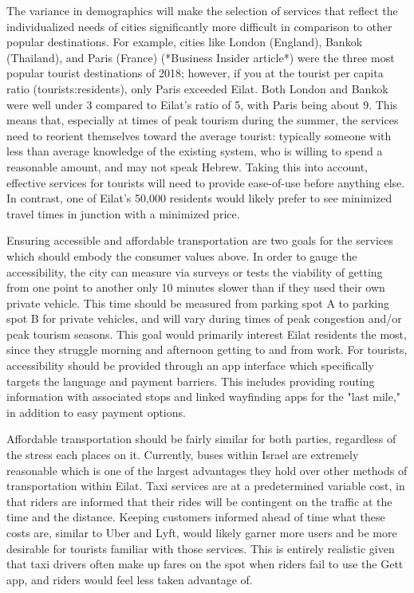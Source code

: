 \documentclass[12pt]{article}                       %
\begin{document}
The variance in demographics will make the selection of services that reflect the individualized needs of cities significantly more difficult in comparison to other popular destinations. For example, cities like London (England), Bankok (Thailand), and Paris (France) (*Business Insider article*) were the three most popular tourist destinations of 2018; however, if you at the tourist per capita ratio (tourists:residents), only Paris exceeded Eilat. Both London and Bankok were well under 3 compared to Eilat's ratio of 5, with Paris being about 9. This means that, especially at times of peak tourism during the summer, the services need to reorient themselves toward the average tourist: typically someone with less than average knowledge of the existing system, who is willing to spend a reasonable amount, and may not speak Hebrew. Taking this into account, effective services for tourists will need to provide ease-of-use before anything else. In contrast, one of Eilat's 50,000 residents would likely prefer to see minimized travel times in junction with a minimized price. 

Ensuring accessible and affordable transportation are two goals for the services which should embody the consumer values above. In order to gauge the accessibility, the city can measure via surveys or tests the viability of getting from one point to another only 10 minutes slower than if they used their own private vehicle. This time should be measured from parking spot A to parking spot B for private vehicles, and will vary during times of peak congestion and/or peak tourism seasons. This goal would primarily interest Eilat residents the most, since they struggle morning and afternoon getting to and from work. For tourists, accessibility should be provided through an app interface which specifically targets the language and payment barriers. This includes providing routing information with associated stops and linked wayfinding apps for the "last mile," in addition to easy payment options. 

Affordable transportation should be fairly similar for both parties, regardless of the stress each places on it. Currently, buses within Israel are extremely reasonable which is one of the largest advantages they hold over other methods of transportation within Eilat. Taxi services are at a predetermined variable cost, in that riders are informed that their rides will be contingent on the traffic at the time and the distance. Keeping customers informed ahead of time what these costs are, similar to Uber and Lyft, would likely garner more users and be more desirable for tourists familiar with those services. This is entirely realistic given that taxi drivers often make up fares on the spot when riders fail to use the Gett app, and riders would feel less taken advantage of.
\end{document}
